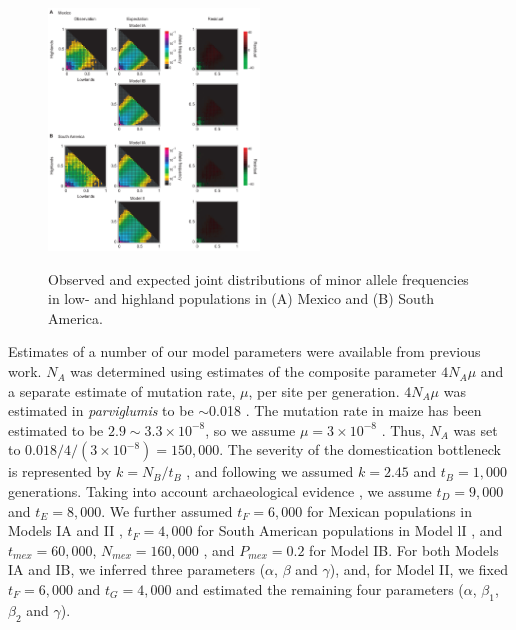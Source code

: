\begin{figure}[tb]   
  \begin{center}
   \vspace{-0mm}
   \includegraphics[width=0.5\textwidth]{fig/Fig4}
   \renewcommand{\baselinestretch}{0.9}
   \vspace{-3mm}
   \caption{Observed and expected joint distributions of minor allele frequencies in low- and highland populations in (A) Mexico and (B) South America. }
\vspace{-6mm}
    \label{JFD}
  \end{center}
\end{figure}

Estimates of a number of our model parameters were available from previous work.    
$N_A$ was determined using estimates of the composite parameter $4N_A\mu$ and a separate estimate of mutation rate, $\mu$, per site per generation.  $4N_A\mu$ was estimated in \emph{parviglumis} to be $\sim$0.018  \cite[]{Eyre-Walker_1998_9539756,Tenaillon_2001_11470895,Tenaillon_2004_15014173,Wright_2005_15919994,Ross-Ibarra_2009_19153259}.  
The mutation rate in maize has been estimated to be $2.9\sim 3.3\times 10^{-8}$, so we assume $\mu=3\times 10^{-8}$ \cite[]{Clark_2005_16079248}.  
Thus, $N_A$ was set to $0.018/4/(3\times 10^{-8}) = 150,000$.
The severity of the domestication bottleneck is represented by $k=N_B/t_B$ \cite[]{Eyre-Walker_1998_9539756,Wright_2005_15919994}, and following \cite{Wright_2005_15919994} we assumed $k=2.45$ and $t_B=1,000$ generations.  
Taking into account archaeological evidence \cite[]{Piperno_2009_19307570}, we assume $t_D=9,000$ and $t_E=8,000$.  
We further assumed $t_F=6,000$ for Mexican populations in Models IA and II \cite[]{Piperno_2006_69}, $t_F=4,000$ for South American populations in Model lI \cite[]{Perry_2006_16511492}, and $t_{mex}=60,000$, $N_{mex}=160,000$ \cite[]{Ross-Ibarra_2009_19153259}, and $P_{mex}=0.2$ \cite[]{vanHeerwaarden_2011_21189301} for Model IB. 
For both Models IA and IB, we inferred three parameters ($\alpha$, $\beta$ and $\gamma$), and, for Model II, we fixed $t_F=6,000$ and $t_G=4,000$ \cite[]{Piperno_2006_69,Perry_2006_16511492} and estimated the remaining four parameters ($\alpha$, $\beta_1$, $\beta_2$ and $\gamma$).


